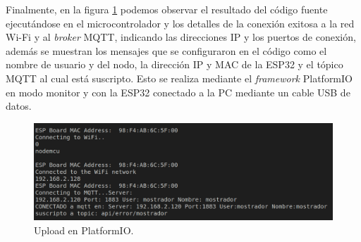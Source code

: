 Finalmente, en la figura \ref{fig:platformio-connect} podemos observar el resultado del código fuente ejecutándose en el microcontrolador y los detalles de la conexión exitosa a la red Wi-Fi y al \textit{broker} MQTT, indicando las direcciones IP y los puertos de conexión, además se muestran los mensajes que se configuraron en el código como el nombre de usuario y del nodo, la dirección IP y MAC de la ESP32 y el tópico MQTT al cual está suscripto. Esto se realiza mediante el \textit{framework}
 PlatformIO en modo monitor y con la ESP32 conectado a la PC mediante un cable USB de datos.
 
\begin{figure}[H]
	\centering
	\includegraphics[width=\textwidth]{./Figures/platformio-connect.png}
	\caption{Upload en PlatformIO.}
	\label{fig:platformio-connect}
\end{figure}












	
		

		
		
		
		



